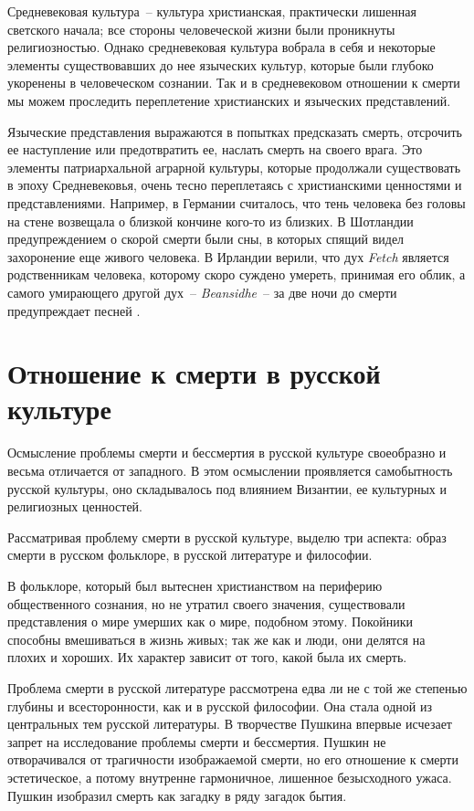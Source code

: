 \documentclass[pscyr,chapters]{hedwork}
\begin{document}
  Средневековая культура~-- культура христианская, практически лишенная
  светского начала; все стороны человеческой жизни были проникнуты
  религиозностью. Однако средневековая культура вобрала в себя и некоторые
  элементы существовавших до нее языческих культур, которые были глубоко
  укоренены в человеческом сознании. Так и в средневековом отношении к смерти мы
  можем проследить переплетение христианских и языческих представлений.

  Языческие представления выражаются в попытках предсказать смерть, отсрочить ее
  наступление или предотвратить ее, наслать смерть на своего врага. Это элементы
  патриархальной аграрной культуры, которые продолжали существовать в эпоху
  Средневековья, очень тесно переплетаясь с христианскими ценностями и
  представлениями. Например, в Германии считалось, что тень человека без
  головы на стене возвещала о близкой кончине кого-то из близких. В Шотландии
  предупреждением о скорой смерти были сны, в которых спящий видел захоронение
  еще живого человека. В Ирландии верили, что дух \emph{Fetch} является
  родственникам человека, которому скоро суждено умереть, принимая его облик, а
  самого умирающего другой дух~-- \emph{Beansidhe}~-- за две ночи до смерти
  предупреждает песней \cite{1}.

  \chapter{Отношение к смерти в русской культуре}

  Осмысление проблемы смерти и бессмертия в русской культуре своеобразно и
  весьма отличается от западного. В этом осмыслении проявляется самобытность
  русской культуры, оно складывалось под влиянием Византии, ее культурных и
  религиозных ценностей.

  Рассматривая проблему смерти в русской культуре, выделю три аспекта: образ
  смерти в русском фольклоре, в русской литературе и философии.

  В фольклоре, который был вытеснен христианством на периферию общественного
  сознания, но не утратил своего значения, существовали представления о мире
  умерших как о мире, подобном этому. Покойники способны вмешиваться в жизнь
  живых; так же как и люди, они делятся на плохих и хороших. Их характер зависит
  от того, какой была их смерть.

  Проблема смерти в русской литературе рассмотрена едва ли не с той же степенью
  глубины и всесторонности, как и в русской философии. Она стала одной из
  центральных тем русской литературы. В творчестве Пушкина впервые исчезает
  запрет на исследование проблемы смерти и бессмертия. Пушкин не отворачивался
  от трагичности изображаемой смерти, но его отношение к смерти эстетическое, а
  потому внутренне гармоничное, лишенное безысходного ужаса. Пушкин изобразил
  смерть как загадку в ряду загадок бытия.
\end{document}
